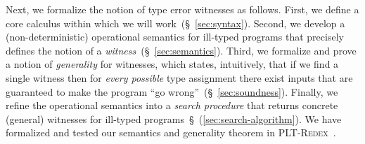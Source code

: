 %
%
%


Next, we formalize the notion of type error witnesses as follows.
%
First, we define a core calculus within which we will work~(\S~\ref{sec:syntax}).
%
Second, we develop a (non-deterministic) operational semantics
for ill-typed programs that precisely defines the notion
of a \emph{witness}~(\S~\ref{sec:semantics}).
%
Third, we formalize and prove a notion of \emph{generality} for
witnesses, which states, intuitively, that if we find a
single witness then for \emph{every possible} type
assignment there exist inputs that are guaranteed to make
the program ``go wrong''~(\S~\ref{sec:soundness}).
%
Finally, we refine the operational semantics into a
\emph{search procedure} that returns concrete (general)
witnesses for ill-typed programs~\S~(\ref{sec:search-algorithm}).
%
We have formalized and tested our semantics and generality theorem
in \textsc{PLT-Redex}~\cite{felleisen2009semantics}.

